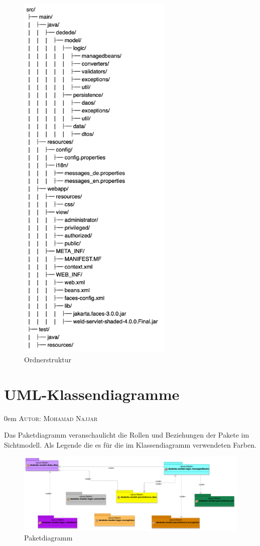 \documentclass{article}
\makeatletter
\newcommand{\sectionauthor}[1]{
	{\parindent 0em \large \scshape Autor: #1 \par \nobreak \vspace*{1em}}
	\@afterheading
}
\makeatother
\begin{document}
\begin{figure}[H]	
\centering
\includegraphics[width = 20em]{FileStructure}
\caption{Ordnerstruktur}
\end{figure}

\section{UML-Klassendiagramme}
\sectionauthor{Mohamad Najjar}


Das Paketdiagramm veranschaulicht  die Rollen und Beziehungen der Pakete im Sichtmodell. Als Legende die es für die im Klassendiagramm verwendeten Farben.

\begin{figure}[H]
		\centering
		\includegraphics[width = 52em]{Paketdiagramm}
		\caption{Paketdiagramm}
	\end{figure}
\end{document}
